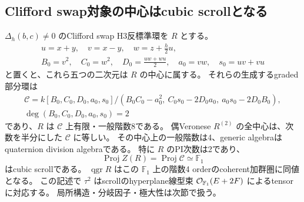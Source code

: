 \subsection{Clifford swap対象の中心はcubic scrollとなる}
\label{subsec:normal-order2-scroll}
\begin{theorem}
\label{thm:normal-order2-scroll-center}
$\Delta_h(b,c)\ne0$ のClifford swap H3反標準環を $R$ とする。
\[
 \begin{gathered}
 u=x+y,\quad v=x-y,\quad w=z+\frac h2u,\\
 B_0=v^2,\quad C_0=w^2,\quad D_0=\frac{uw+wu}{2},\quad a_0=vw,\quad s_0=uv+vu
 \end{gathered}
\]
と置くと、これら五つの二次元は $R$ の中心に属する。
それらの生成するgraded部分環は
\[
 \begin{gathered}
 \mathcal C=k[B_0,C_0,D_0,a_0,s_0]/
 (B_0C_0-a_0^2,\ C_0s_0-2D_0a_0,\ a_0s_0-2D_0B_0),\\
 \deg(B_0,C_0,D_0,a_0,s_0)=2
 \end{gathered}
\]
であり、$R$ は $\mathcal C$ 上有限・一般階数8である。
偶Veronese $R^{(2)}$ の全中心は、次数を半分にした $\mathcal C$ に等しい。
その中心上の一般階数は4、generic algebraはquaternion division algebraである。
特に $R$ のPI次数は2であり、
\[
 \operatorname{Proj}Z(R)=\operatorname{Proj}\mathcal C\simeq\mathbb F_1
\]
はcubic scrollである。
$\operatorname{qgr}R$ はこの $\mathbb F_1$ 上の階数4 orderのcoherent加群圏に同値となる。
この記述で $\tau^2$ はscrollのhyperplane線型束 $\mathcal O_{\mathbb F_1}(E+2F)$ によるtensorに対応する。
局所構造・分岐因子・極大性は次節で扱う。
\end{theorem}

